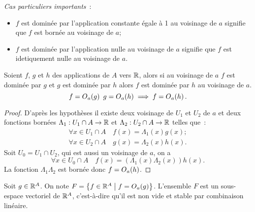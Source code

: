 \emph{Cas particuliers importants}~:
\begin{itemize}
\item \(f\) est dominée par l'application constante égale à 1 au voisinage de \(a\) signifie que \(f\) est bornée au voisinage de \(a\);
\item \(f\) est dominée par l'application nulle au voisinage de \(a\) signifie que \(f\) est idetiquement nulle au voisinage de \(a\).
\end{itemize}

\begin{prop}[Transitivité]
  Soient \(f\), \(g\) et \(h\) des applications de \(A\) vers \(\mathbb{R}\), alors si au voisinage de \(a\) \(f\) est dominée par \(g\) et \(g\) est dominée par \(h\) alors \(f\) est dominée par \(h\) au voisinage de \(a\).
  \begin{equation}
    f=O\mathopen{}_{a}\left(g\right) \ g=O\mathopen{}_{a}\left(h\right) \implies f=O\mathopen{}_{a}\left(h\right).
  \end{equation}
\end{prop}
\begin{proof}
  D'après les hypothèses il existe deux voisinage de \(U_1\) et \(U_2\) de \(a\) et deux fonctions bornées \(\Lambda_1:U_1 \cap A \rightarrow \mathbb{R}\) et \(\Lambda_2:U_2 \cap A \rightarrow \mathbb{R}\) telles que~:
  \begin{gather}
    \forall x \in U_1\cap A \quad f(x)=\Lambda_1(x)g(x);\\
    \forall x \in U_2\cap A \quad g(x)=\Lambda_2(x)h(x).
  \end{gather}
  Soit \(U_0=U_1 \cap U_2\), qui est aussi un voisinage de \(a\), on a
  \begin{equation}
    \forall x \in U_0 \cap A \quad f(x) = (\Lambda_1(x) \Lambda_2(x)) h(x).
  \end{equation}
  La fonction \(\Lambda_1 \Lambda_2\) est bornée donc \(f=O\mathopen{}_{a}\left(h\right)\).
\end{proof}
\begin{prop}
  Soit \(g \in \mathbb{R}^A\). On note \(F=\left\{f \in \mathbb{R}^A\mathrel{}\middle|\mathrel{}f=O\mathopen{}_{a}\left(g\right)\right\}\). L'ensemble \(F\) est un sous-espace vectoriel de \(\mathbb{R}^A\), c'est-à-dire qu'il est non vide et stable par combinaison linéaire.
\end{prop}
